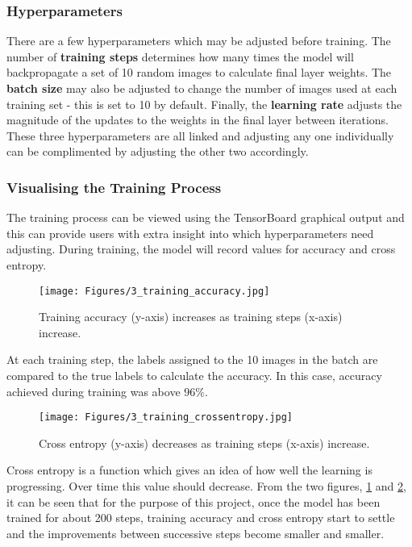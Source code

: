 \subsubsection*{Hyperparameters}
There are a few hyperparameters which may be adjusted before training. The number of \textbf{training steps} determines how many times the model will backpropagate a set of 10 random images to calculate final layer weights. The \textbf{batch size} may also be adjusted to change the number of images used at each training set - this is set to 10 by default. Finally, the \textbf{learning rate} adjusts the magnitude of the updates to the weights in the final layer between iterations. These three hyperparameters are all linked and adjusting any one individually can be complimented by adjusting the other two accordingly.

\subsubsection*{Visualising the Training Process}
The training process can be viewed using the TensorBoard graphical output and this can provide users with extra insight into which hyperparameters need adjusting. During training, the model will record values for accuracy and cross entropy. 

\begin{figure}[H]
\centering
\texttt{[image: Figures/3\_training\_accuracy.jpg]}
\decoRule
\caption[Training Accuracy]{Training accuracy (y-axis) increases as training steps (x-axis) increase.}
\label{fig:training_accuracy}
\end{figure}

At each training step, the labels assigned to the 10 images in the batch are compared to the true labels to calculate the accuracy. In this case, accuracy achieved during training was above $96\%$.

\begin{figure}[H]
\centering
\texttt{[image: Figures/3\_training\_crossentropy.jpg]}
\decoRule
\caption[Training Cross Entropy]{Cross entropy (y-axis) decreases as training steps (x-axis) increase.}
\label{fig:cross_entropy}
\end{figure}

Cross entropy is a function which gives an idea of how well the learning is progressing. Over time this value should decrease. From the two figures, \ref{fig:training_accuracy} and \ref{fig:cross_entropy}, it can be seen that for the purpose of this project, once the model has been trained for about 200 steps, training accuracy and cross entropy start to settle and the improvements between successive steps become smaller and smaller.

